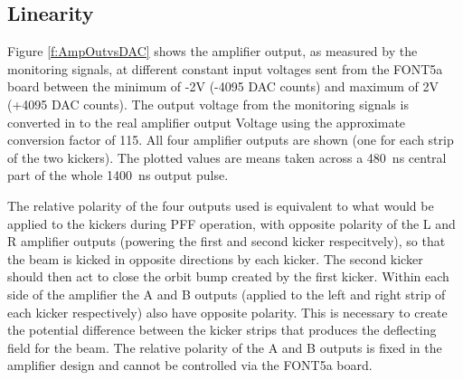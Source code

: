 
\subsection{Linearity}
\label{ss:ampLin}

Figure \ref{f:AmpOutvsDAC} shows the amplifier output, as measured by the monitoring signals, at different constant input voltages sent from the FONT5a board between the minimum of -2V (-4095 DAC counts) and maximum of 2V (+4095 DAC counts). The output voltage from the monitoring signals is converted in to the real amplifier output Voltage using the approximate conversion factor of 115. All four amplifier outputs are shown (one for each strip of the two kickers). The plotted values are means taken across a 480~ns central part of the whole 1400~ns output pulse.

The relative polarity of the four outputs used is equivalent to what would be applied to the kickers during PFF operation, with opposite polarity of the L and R amplifier outputs (powering the first and second kicker respecitvely), so that the beam is kicked in opposite directions by each kicker. The second kicker should then act to close the orbit bump created by the first kicker. Within each side of the amplifier the A and B outputs (applied to the left and right strip of each kicker respectively) also have opposite polarity. This is necessary to create the potential difference between the kicker strips that produces the deflecting field for the beam. The relative polarity of the A and B outputs is fixed in the amplifier design and cannot be controlled via the FONT5a board.

